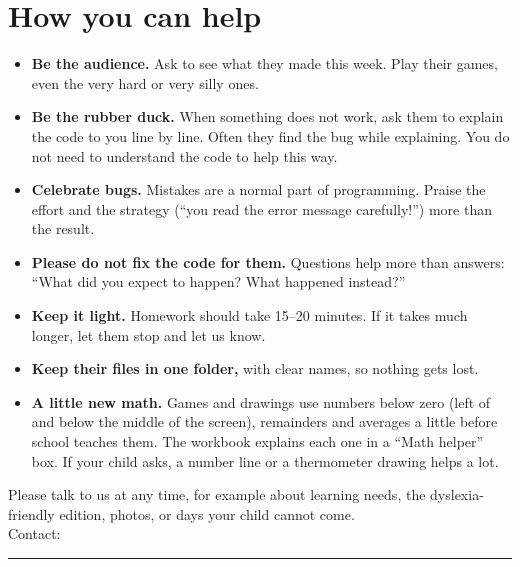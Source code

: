 \documentclass[level=2]{kidscode}
\begin{document}
\section{How you can help}
\begin{itemize}[itemsep=2pt]
  \item \textbf{Be the audience.} Ask to see what they made this week. Play their games, even
        the very hard or very silly ones.
  \item \textbf{Be the rubber duck.} When something does not work, ask them to explain the code to
        you line by line. Often they find the bug while explaining. You do not need to understand
        the code to help this way.
  \item \textbf{Celebrate bugs.} Mistakes are a normal part of programming. Praise the effort and
        the strategy (\enquote{you read the error message carefully!}) more than the result.
  \item \textbf{Please do not fix the code for them.} Questions help more than answers:
        \enquote{What did you expect to happen? What happened instead?}
  \item \textbf{Keep it light.} Homework should take 15--20 minutes. If it takes much longer,
        let them stop and let us know.
  \item \textbf{Keep their files in one folder,} with clear names, so nothing gets lost.
  \item \textbf{A little new math.} Games and drawings use numbers below zero (left of and below the middle
        of the screen), remainders and averages a little before school teaches them. The workbook explains each
        one in a \enquote{Math helper} box. If your child asks, a number line or a thermometer drawing helps a lot.
\end{itemize}

\begin{tip}
Please talk to us at any time, for example about learning needs, the dyslexia-friendly edition,
photos, or days your child cannot come.\\[6pt]
Contact: \rule{7cm}{0.4pt}
\end{tip}
\end{document}
